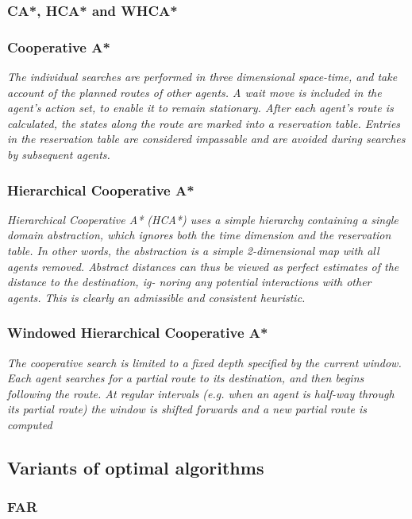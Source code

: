 \documentclass[a4paper,11pt]{article}
\begin{document}
\subsubsection{CA*, HCA* and WHCA*}
\cite{silver2005cooperative}
\subsubsection*{Cooperative A*}
\textit{The individual searches are performed in three dimensional space-time, and take account of the planned routes of other agents. A wait move is included in the agent’s action set, to enable it to remain stationary. After each agent’s route is calculated, the states along the route are marked into a reservation table. Entries in the reservation table are considered impassable and are avoided during searches by subsequent agents.
}
\subsubsection*{Hierarchical Cooperative A*}
\textit{Hierarchical Cooperative A* (HCA*) uses a simple hierarchy containing a single domain abstraction, which ignores both the time dimension and the reservation table. In other words, the abstraction is a simple 2-dimensional map with all agents removed. Abstract distances can thus be viewed as perfect estimates of the distance to the destination, ig- noring any potential interactions with other agents. This is clearly an admissible and consistent heuristic.}


\subsubsection*{Windowed Hierarchical Cooperative A*}
\textit{The cooperative search is limited to a fixed depth specified by the current window. Each agent searches for a partial route to its destination, and then begins following the route. At regular intervals (e.g. when an agent is half-way through its partial route) the window is shifted forwards and a new partial route is computed}

\subsection{Variants of optimal algorithms}

\subsubsection{FAR}
\cite{wang2008fast}
\end{document}
